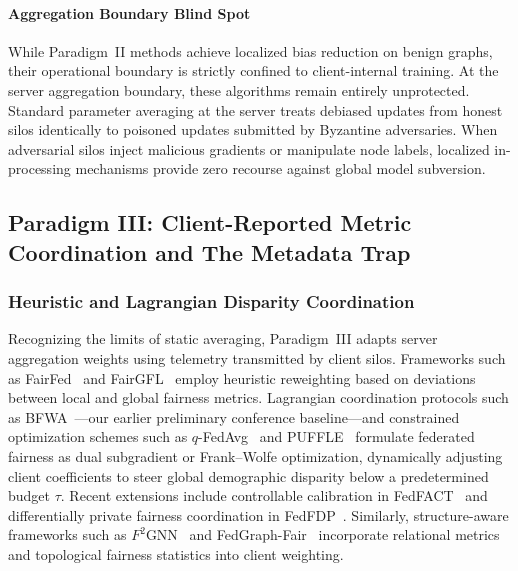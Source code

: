 \paragraph{Aggregation Boundary Blind Spot}
While Paradigm~II methods achieve localized bias reduction on benign graphs, their operational boundary is strictly confined to client-internal training. At the server aggregation boundary, these algorithms remain entirely unprotected. Standard parameter averaging at the server treats debiased updates from honest silos identically to poisoned updates submitted by Byzantine adversaries. When adversarial silos inject malicious gradients or manipulate node labels, localized in-processing mechanisms provide zero recourse against global model subversion.

\subsection{Paradigm III: Client-Reported Metric Coordination and The Metadata Trap}
\label{subsec:rw_paradigm_3}

\subsubsection{Heuristic and Lagrangian Disparity Coordination}
Recognizing the limits of static averaging, Paradigm~III adapts server aggregation weights using telemetry transmitted by client silos. Frameworks such as FairFed~\citep{ezzeldin2023fairfed} and FairGFL~\citep{zhou2026fairgfl} employ heuristic reweighting based on deviations between local and global fairness metrics. Lagrangian coordination protocols such as BFWA~\citep{dang2026fedfairgnn}---our earlier preliminary conference baseline---and constrained optimization schemes such as $q$-FedAvg~\citep{li2020fair} and PUFFLE~\citep{corbucci2024puffle} formulate federated fairness as dual subgradient or Frank--Wolfe optimization, dynamically adjusting client coefficients to steer global demographic disparity below a predetermined budget $\tau$. Recent extensions include controllable calibration in FedFACT~\citep{fedfact2025} and differentially private fairness coordination in FedFDP~\citep{ling2024feddp}. Similarly, structure-aware frameworks such as $F^2\text{GNN}$~\citep{f2gnn2023} and FedGraph-Fair~\citep{khan2026fedgraphfair} incorporate relational metrics and topological fairness statistics into client weighting.

